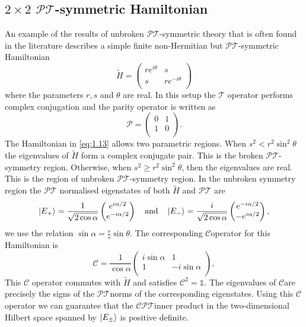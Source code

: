 \documentclass[12pt, a4paper]{report}
\newcommand\PT{\(\mathcal{PT}\)}
\newcommand\TT{\(\mathcal{T}\)}
\newcommand\CC{\(\mathcal{C}\)}
\begin{document}
\subsection{$2\times2$ \PT-symmetric Hamiltonian}
An example of the results of unbroken \PT-symmetric theory that is often found in the literature describes a simple finite non-Hermitian but \PT-symmetric Hamiltonian
\begin{equation}\label{eq:1.13}
\tilde{H} = \begin{pmatrix}
re^{i\theta} & s  \\
s & re^{-i\theta} \\
\end{pmatrix}
\end{equation}
where the parameters $r, s$ and $\theta$ are real. In this setup the \TT\: operator performs complex conjugation and the parity operator is written as
\begin{equation}\label{eq:1.14}
\mathcal{P} = \begin{pmatrix}
0 & 1  \\
1 & 0 \\
\end{pmatrix}.
\end{equation}
The Hamiltonian in \ref{eq:1.13} allows two parametric regions. When $s^2 < r^2\sin^2\theta$ the eigenvalues of $\tilde{H}$ form a complex conjugate pair. This is the broken \PT-symmetry region. Otherwise, when $s^2 \geq r^2\sin^2\theta$, then the eigenvalues are real. This is the region of unbroken \PT-symmetry region. In the unbroken symmetry region the \PT\: normalised eigenstates of both $\tilde{H}$ and \PT\: are
\begin{equation}\label{eq:1.15}
\ket{E_{+}} = \frac{1}{\sqrt{2\cos\alpha}}\begin{pmatrix}
e^{i\alpha/2} \\
e^{-i\alpha/2} \\
\end{pmatrix}\quad\mathrm{and}\quad\ket{E_{-}} = \frac{i}{\sqrt{2\cos\alpha}}\begin{pmatrix}
e^{-i\alpha/2} \\
-e^{i\alpha/2} \\
\end{pmatrix},
\end{equation}
we use the relation $\sin\alpha = \frac{r}{s}\sin\theta$.
The corresponding \CC operator for this Hamiltonian is 
\begin{equation}\label{eq:1.16}
\mathcal{C} = \frac{1}{\cos\alpha}\begin{pmatrix}
i\sin\alpha & 1 \\
1 & -i\sin\alpha\\
\end{pmatrix},
\end{equation}
This \CC\: operator commutes with $\tilde{H}$ and satisfies $\mathcal{C}^2= \mathds{1}$. The eigenvalues of \CC\:are precisely the signs of the \PT\:norms of the corresponding eigenstates\cite{Bender_2004}. Using this \CC\: operator we can guarantee that the \CC\PT inner product in the two-dimensional Hilbert space spanned by $\ket{E_{\pm}}$ is positive definite.
\end{document}

